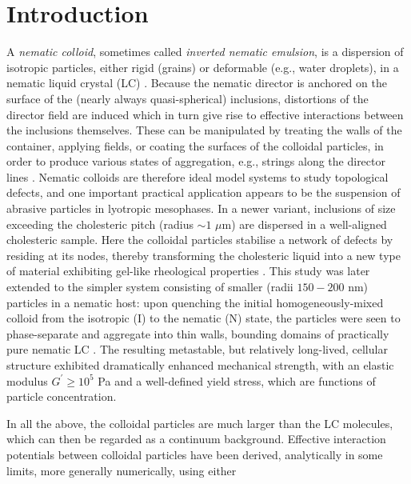 \documentclass[aps,pre,twocolumn,groupedaddress,showpacs]{revtex4}
\begin{document}
\section{Introduction}
\label{sect-intro}


A {\it nematic colloid}, sometimes called {\it inverted nematic emulsion}, 
is a dispersion of isotropic particles, either rigid (grains) or deformable 
(e.g., water droplets), in a nematic liquid crystal (LC) \cite{Stark:2001}.
Because the nematic director is anchored on the surface of the (nearly always 
quasi-spherical) inclusions, distortions of the director field are induced 
which in turn give rise to effective interactions between the inclusions 
themselves. These can be manipulated by treating the walls of the container, 
applying fields, or coating the surfaces of the colloidal particles, in order
to produce various states of aggregation, e.g., strings along the director
lines \cite{Poulin:1997}. Nematic colloids are therefore ideal model systems 
to study topological defects, and one important practical application appears
to be the suspension of abrasive particles in lyotropic mesophases. 
In a newer variant, inclusions of size exceeding the cholesteric pitch (radius
$\sim 1$ $\mu$m) are dispersed in a well-aligned cholesteric sample. Here the 
colloidal particles stabilise a network of defects by residing at its nodes, 
thereby transforming the cholesteric liquid into a new type of material 
exhibiting gel-like rheological properties \cite{Zapotocky:1999}. 
This study was later extended to the simpler system consisting of smaller 
(radii $150-200$ nm) particles in a nematic host: upon quenching the initial 
homogeneously-mixed colloid from the isotropic (I) to the nematic (N) state, 
the particles were seen to phase-separate and aggregate into thin walls, 
bounding domains of practically pure nematic LC \cite{Val}. The 
resulting metastable, but relatively long-lived, cellular structure exhibited 
dramatically enhanced mechanical strength, with an elastic modulus $G^{\prime}
\ge 10^5$ Pa and a well-defined yield stress, which are functions of particle
concentration. 
\par
In all the above, the colloidal particles are much larger than the LC 
molecules, which can then be regarded as a continuum background. Effective 
interaction potentials between colloidal particles have been derived, 
analytically in some limits, more generally numerically, using either 
\end{document}
